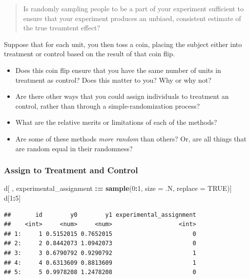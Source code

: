 \documentclass[
]{article}
\newenvironment{Shaded}{\begin{snugshade}}{\end{snugshade}}
\newcommand{\AttributeTok}[1]{\textcolor[rgb]{0.13,0.29,0.53}{#1}}
\newcommand{\ConstantTok}[1]{\textcolor[rgb]{0.56,0.35,0.01}{#1}}
\newcommand{\DecValTok}[1]{\textcolor[rgb]{0.00,0.00,0.81}{#1}}
\newcommand{\FunctionTok}[1]{\textcolor[rgb]{0.13,0.29,0.53}{\textbf{#1}}}
\newcommand{\NormalTok}[1]{#1}
\newcommand{\SpecialCharTok}[1]{\textcolor[rgb]{0.81,0.36,0.00}{\textbf{#1}}}
\providecommand{\tightlist}{%
  \setlength{\itemsep}{0pt}\setlength{\parskip}{0pt}}
\theoremstyle{definition}
\theoremstyle{definition}
\theoremstyle{definition}
\theoremstyle{definition}
\theoremstyle{remark}
\begin{document}
\begin{quote}
Is randomly sampling people to be a part of your experiment sufficient to ensure that your experiment produces an unbiaed, consistent estimate of the true treamtent effect?
\end{quote}

Suppose that for each unit, you then toss a coin, placing the subject either into treatment or control based on the result of that coin flip.

\begin{itemize}
\tightlist
\item
  Does this coin flip ensure that you have the same number of units in treatment as control? Does this matter to you? Why or why not?
\item
  Are there other ways that you could assign individuals to treatment an control, rather than through a simple-randomization process?
\item
  What are the relative merits or limitations of each of the methods?
\item
  Are some of these methods \emph{more random} than others? Or, are all things that are random equal in their randomness?
\end{itemize}

\subsubsection{Assign to Treatment and Control}\label{assign-to-treatment-and-control}

\begin{Shaded}
\begin{Highlighting}[]
\NormalTok{d[ , experimental\_assignment }\SpecialCharTok{:=} \FunctionTok{sample}\NormalTok{(}\DecValTok{0}\SpecialCharTok{:}\DecValTok{1}\NormalTok{, }\AttributeTok{size =}\NormalTok{ .N, }\AttributeTok{replace =} \ConstantTok{TRUE}\NormalTok{)]}
\NormalTok{d[}\DecValTok{1}\SpecialCharTok{:}\DecValTok{5}\NormalTok{]}
\end{Highlighting}
\end{Shaded}

\begin{verbatim}
##       id        y0        y1 experimental_assignment
##    <int>     <num>     <num>                   <int>
## 1:     1 0.5152015 0.7652015                       0
## 2:     2 0.8442073 1.0942073                       0
## 3:     3 0.6790792 0.9290792                       1
## 4:     4 0.6313609 0.8813609                       1
## 5:     5 0.9978208 1.2478208                       0
\end{verbatim}
\end{document}
